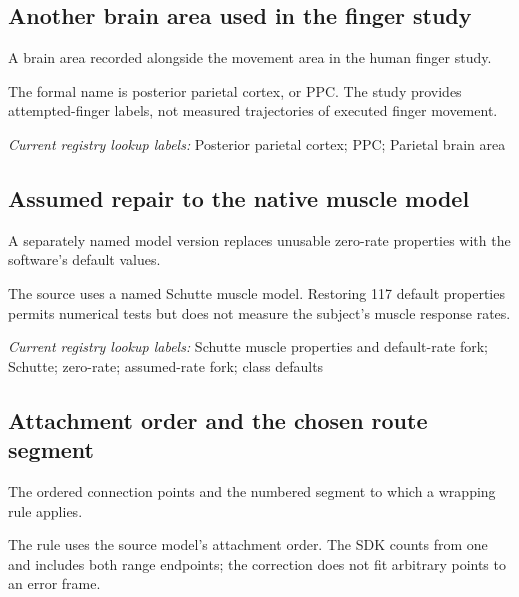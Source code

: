 \begin{samepage}
\subsection*{Another brain area used in the finger study}
\noindent A brain area recorded alongside the movement area in the human finger study.\par
\end{samepage}
\begin{samepage}
\noindent The formal name is posterior parietal cortex, or PPC. The study provides attempted-finger labels, not measured trajectories of executed finger movement.\par\nopagebreak[4]

\end{samepage}


\noindent\textit{Current registry lookup labels:} Posterior parietal cortex; PPC; Parietal brain area\par

\begin{samepage}
\subsection*{Assumed repair to the native muscle model}
\noindent A separately named model version replaces unusable zero-rate properties with the software’s default values.\par
\end{samepage}
\begin{samepage}
\noindent The source uses a named Schutte muscle model. Restoring 117 default properties permits numerical tests but does not measure the subject’s muscle response rates.\par\nopagebreak[4]

\end{samepage}


\noindent\textit{Current registry lookup labels:} Schutte muscle properties and default-rate fork; Schutte; zero-rate; assumed-rate fork; class defaults\par

\begin{samepage}
\subsection*{Attachment order and the chosen route segment}
\noindent The ordered connection points and the numbered segment to which a wrapping rule applies.\par
\end{samepage}
\begin{samepage}
\noindent The rule uses the source model’s attachment order. The SDK counts from one and includes both range endpoints; the correction does not fit arbitrary points to an error frame.\par\nopagebreak[4]

\end{samepage}


